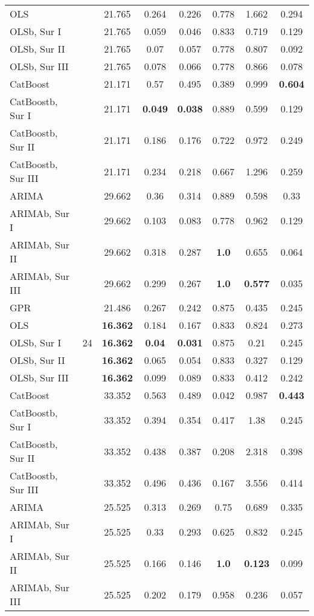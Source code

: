 \begin{longtable}[ht]{|l|c|c|c|c|c|c|c|}
OLS &   & 21.765 & 0.264 & 0.226 & 0.778 & 1.662 & 0.294 \\
OLSb, Sur I &   & 21.765 & 0.059 & 0.046 & 0.833 & 0.719 & 0.129 \\
OLSb, Sur II &   & 21.765 & 0.07 & 0.057 & 0.778 & 0.807 & 0.092 \\
OLSb, Sur III &   & 21.765 & 0.078 & 0.066 & 0.778 & 0.866 & 0.078 \\
CatBoost &   & 21.171 & 0.57 & 0.495 & 0.389 & 0.999 & \textbf{0.604} \\
CatBoostb, Sur I &   & 21.171 & \textbf{0.049} & \textbf{0.038} & 0.889 & 0.599 & 0.129 \\
CatBoostb, Sur II &   & 21.171 & 0.186 & 0.176 & 0.722 & 0.972 & 0.249 \\
CatBoostb, Sur III &   & 21.171 & 0.234 & 0.218 & 0.667 & 1.296 & 0.259 \\
ARIMA &   & 29.662 & 0.36 & 0.314 & 0.889 & 0.598 & 0.33 \\
ARIMAb, Sur I &   & 29.662 & 0.103 & 0.083 & 0.778 & 0.962 & 0.129 \\
ARIMAb, Sur II &   & 29.662 & 0.318 & 0.287 & \textbf{1.0} & 0.655 & 0.064 \\
ARIMAb, Sur III &   & 29.662 & 0.299 & 0.267 & \textbf{1.0} & \textbf{0.577} & 0.035 \\
\hline
GPR & \multirow{5}{*}{24} & 21.486 & 0.267 & 0.242 & 0.875 & 0.435 & 0.245 \\
OLS &   & \textbf{16.362} & 0.184 & 0.167 & 0.833 & 0.824 & 0.273 \\
OLSb, Sur I &   & \textbf{16.362} & \textbf{0.04} & \textbf{0.031} & 0.875 & 0.21 & 0.245 \\
OLSb, Sur II &   & \textbf{16.362} & 0.065 & 0.054 & 0.833 & 0.327 & 0.129 \\
OLSb, Sur III &   & \textbf{16.362} & 0.099 & 0.089 & 0.833 & 0.412 & 0.242 \\
CatBoost &   & 33.352 & 0.563 & 0.489 & 0.042 & 0.987 & \textbf{0.443} \\
CatBoostb, Sur I &   & 33.352 & 0.394 & 0.354 & 0.417 & 1.38 & 0.245 \\
CatBoostb, Sur II &   & 33.352 & 0.438 & 0.387 & 0.208 & 2.318 & 0.398 \\
CatBoostb, Sur III &   & 33.352 & 0.496 & 0.436 & 0.167 & 3.556 & 0.414 \\
ARIMA &   & 25.525 & 0.313 & 0.269 & 0.75 & 0.689 & 0.335 \\
ARIMAb, Sur I &   & 25.525 & 0.33 & 0.293 & 0.625 & 0.832 & 0.245 \\
ARIMAb, Sur II &   & 25.525 & 0.166 & 0.146 & \textbf{1.0} & \textbf{0.123} & 0.099 \\
ARIMAb, Sur III &   & 25.525 & 0.202 & 0.179 & 0.958 & 0.236 & 0.057 \\
\hline
\end{longtable}
